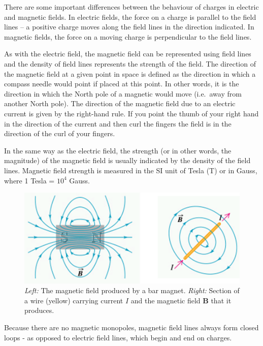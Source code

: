 \documentclass[
  letterpaper,
  DIV=11,
  numbers=noendperiod]{scrreprt}
\begin{document}
There are some important differences between the behaviour of charges in
electric and magnetic fields. In electric fields, the force on a charge
is parallel to the field lines -- a positive charge moves along the
field lines in the direction indicated. In magnetic fields, the force on
a moving charge is perpendicular to the field lines.

As with the electric field, the magnetic field can be represented using
field lines and the density of field lines represents the strength of
the field. The direction of the magnetic field at a given point in space
is defined as the direction in which a compass needle would point if
placed at this point. In other words, it is the direction in which the
North pole of a magnetic would move (i.e.~away from another North pole).
The direction of the magnetic field due to an electric current is given
by the right-hand rule. If you point the thumb of your right hand in the
direction of the current and then curl the fingers the field is in the
direction of the curl of your fingers.

In the same way as the electric field, the strength (or in other words,
the magnitude) of the magnetic field is usually indicated by the density
of the field lines. Magnetic field strength is measured in the SI unit
of Tesla (T) or in Gauss, where 1 Tesla = \(10^4\) Gauss.

\begin{figure}[H]

{\centering \includegraphics[width=5.20833in,height=\textheight]{Figures/MagFields.png}

}

\caption{\emph{Left:} The magnetic field produced by a bar magnet.
\emph{Right:} Section of a wire (yellow) carrying current \(I\) and the
magnetic field \(\mathrm{\mathbf{B}}\) that it produces.}

\end{figure}%

Because there are no magnetic monopoles, magnetic field lines always
form closed loops - as opposed to electric field lines, which begin and
end on charges.
\end{document}
